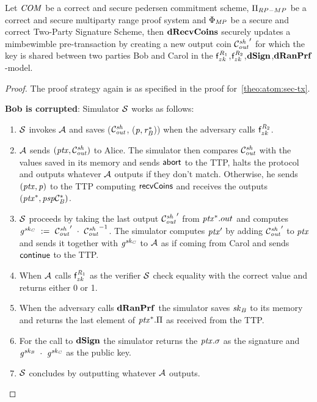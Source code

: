 \begin{theorem}
    \label{teo:atom:sec-drecv}
    Let $\mathit{COM}$ be a correct and secure pedersen commitment scheme, $\Pi_{RP-MP}$ be a correct and secure multiparty range proof system and $\Phi_{\mathit{MP}}$ be a secure and correct Two-Party Signature Scheme, then $\mathbf{dRecvCoins}$ securely updates a mimbewimble pre-transaction by creating a new output coin ${\mathcal{C}_{\mathit{out}}^{\mathit{sh}}}'$ for which the key is shared between two parties Bob and Carol in the $\mathsf{f}^{\mathit{R}_1}_{zk}$,$\mathsf{f}^{\mathit{R}_2}_{zk}$,$\mathbf{dSign}$,$\mathbf{dRanPrf}$-model.
\end{theorem}

\begin{proof}
    The proof strategy again is as specified in the proof for~\cref{theo:atom:sec-tx}.

    \textbf{Bob is corrupted}: Simulator $\mathcal{S}$ works as follows:
    \begin{enumerate}
        \item $\mathcal{S}$ invokes $\mathcal{A}$ and saves ($\mathcal{C}_{\mathit{out}}^{\mathit{sh}}$, ($\mathit{p}, \mathit{r}_{\mathit{B}}^*$)) when the adversary calls $\mathsf{f}^{\mathit{R}_2}_{zk}$.
        \item $\mathcal{A}$ sends $(\mathit{ptx},\mathcal{C}_{\mathit{out}}^{\mathit{sh}})$ to Alice.
        The simulator then compares $\mathcal{C}_{\mathit{out}}^{\mathit{sh}}$ with the values saved in its memory and sends $\mathsf{abort}$ to the TTP, halts the protocol and outputs whatever $\mathcal{A}$ outputs if they don't match.
        Otherwise, he sends $(\mathit{ptx}, \mathit{p})$ to the TTP computing $\mathsf{recvCoins}$ and receives the outputs $(\mathit{ptx}^*, \mathit{psp}\mathcal{C}_{\mathit{B}}^*)$.
        \item $\mathcal{S}$ proceeds by taking the last output ${\mathcal{C}_{\mathit{out}}^{\mathit{sh}}}'$ from $\mathit{ptx}^*.out$ and computes $\mathit{g}^{\mathit{sk}_{\mathit{C}}} ~:=~ {\mathcal{C}_{\mathit{out}}^{\mathit{sh}}}' ~\cdot~ {\mathcal{C}_{\mathit{out}}^{\mathit{sh}}}^{-1}$.
        The simulator computes ${\mathit{ptx}}'$ by adding ${\mathcal{C}_{\mathit{out}}^{\mathit{sh}}}'$ to $\mathit{ptx}$ and sends it together with $\mathit{g}^{\mathit{sk}_{\mathit{C}}}$ to $\mathcal{A}$ as if coming from Carol and sends $\mathsf{continue}$ to the TTP.
        \item When $\mathcal{A}$ calls $\mathsf{f}^{\mathit{R}_1}_{zk}$ as the verifier $\mathcal{S}$ check equality with the correct value and returns either 0 or 1.
        \item When the adversary calls $\mathbf{dRanPrf}$ the simulator saves $\mathit{sk}_{\mathit{B}}$ to its memory and returns the last element of $\mathit{ptx}^*.\Pi$ as received from the TTP.
        \item For the call to $\mathbf{dSign}$ the simulator returns the $\mathit{ptx}.\sigma$ as the signature and $\mathit{g}^{\mathit{sk}_{\mathit{B}}} ~\cdot~ \mathit{g}^{\mathit{sk}_{\mathit{C}}}$ as the public key.
        \item $\mathcal{S}$ concludes by outputting whatever $\mathcal{A}$ outputs.
    \end{enumerate}


\end{proof}
